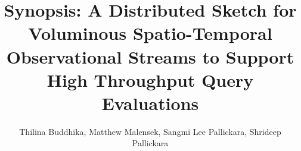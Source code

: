\documentclass{vldb}
\begin{document}
\title{Synopsis: A Distributed Sketch for Voluminous Spatio-Temporal Observational Streams to Support High Throughput Query Evaluations}

\author{
\alignauthor
Thilina Buddhika, Matthew Malensek, Sangmi Lee Pallickara, Shrideep Pallickara \\
       \\
       \\
       \\
}


\maketitle













\end{document}

